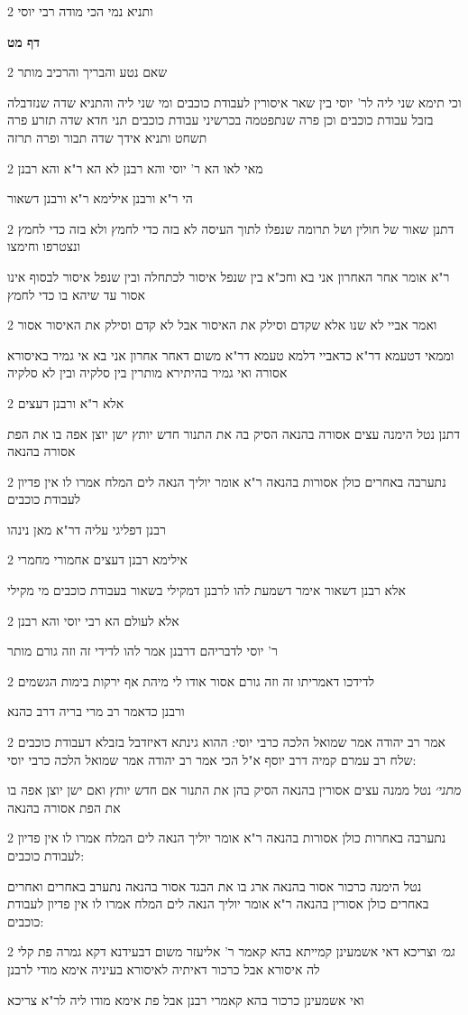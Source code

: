 \documentclass[12pt, openany]{book}
\newcommand{\sethebfont}{
\fontsize{10.5pt}{21.0pt} \selectfont
}
\newcommand{\twocol}[1]{
	{\sethebfont \begin{multicols}{2}
			#1
	\end{multicols}}	
}
\newcommand{\sectname}{}
\newcommand{\newsection}[1]{
	\addcontentsline{toc}{section}{#1}
	\renewcommand{\sectname}{#1}	
	\vspace{-\baselineskip}
	\begin{center}
		\textbf{%
\fontsize{16pt}{16pt}\selectfont
			#1}
	\end{center}
	\vspace{-\baselineskip}
	\nopagebreak
}
\begin{document}
\twocol{ותניא נמי הכי מודה רבי יוסי}
\newsection{דף מט}
\twocol{שאם נטע והבריך והרכיב מותר
\par וכי תימא שני ליה לר' יוסי בין שאר איסורין לעבודת כוכבים ומי שני ליה והתניא שדה שנזדבלה בזבל עבודת כוכבים וכן פרה שנתפטמה בכרשיני עבודת כוכבים תני חדא שדה תזרע פרה תשחט ותניא אידך שדה תבור ופרה תרזה}
\twocol{מאי לאו הא ר' יוסי והא רבנן לא הא ר"א והא רבנן
\par הי ר"א ורבנן אילימא ר"א ורבנן דשאור}
\twocol{דתנן שאור של חולין ושל תרומה שנפלו לתוך העיסה לא בזה כדי לחמץ ולא בזה כדי לחמץ ונצטרפו וחימצו
\par ר"א אומר אחר האחרון אני בא וחכ"א בין שנפל איסור לכתחלה ובין שנפל איסור לבסוף אינו אסור עד שיהא בו כדי לחמץ}
\twocol{ואמר אביי לא שנו אלא שקדם וסילק את האיסור אבל לא קדם וסילק את האיסור אסור
\par וממאי דטעמא דר"א כדאביי דלמא טעמא דר"א משום דאחר אחרון אני בא אי גמיר באיסורא אסורה ואי גמיר בהיתירא מותרין בין סלקיה ובין לא סלקיה}
\twocol{אלא ר"א ורבנן דעצים
\par דתנן נטל הימנה עצים אסורה בהנאה הסיק בה את התנור חדש יותץ ישן יוצן אפה בו את הפת אסורה בהנאה}
\twocol{נתערבה באחרים כולן אסורות בהנאה ר"א אומר יוליך הנאה לים המלח אמרו לו אין פדיון לעבודת כוכבים
\par רבנן דפליגי עליה דר"א מאן נינהו}
\twocol{אילימא רבנן דעצים אחמורי מחמרי
\par אלא רבנן דשאור אימר דשמעת להו לרבנן דמקילי בשאור בעבודת כוכבים מי מקילי}
\twocol{אלא לעולם הא רבי יוסי והא רבנן
\par ר' יוסי לדבריהם דרבנן אמר להו לדידי זה וזה גורם מותר}
\twocol{לדידכו דאמריתו זה וזה גורם אסור אודו לי מיהת אף ירקות בימות הגשמים
\par ורבנן כדאמר רב מרי בריה דרב כהנא}
\twocol{אמר רב יהודה אמר שמואל הלכה כרבי יוסי: ההוא גינתא דאיזדבל בזבלא דעבודת כוכבים שלח רב עמרם קמיה דרב יוסף א"ל הכי אמר רב יהודה אמר שמואל הלכה כרבי יוסי:
\par {\large\emph{מתני׳}} נטל ממנה עצים אסורין בהנאה הסיק בהן את התנור אם חדש יותץ ואם ישן יוצן אפה בו את הפת אסורה בהנאה}
\twocol{נתערבה באחרות כולן אסורות בהנאה ר"א אומר יוליך הנאה לים המלח אמרו לו אין פדיון לעבודת כוכבים:
\par נטל הימנה כרכור אסור בהנאה ארג בו את הבגד אסור בהנאה נתערב באחרים ואחרים באחרים כולן אסורין בהנאה ר"א אומר יוליך הנאה לים המלח אמרו לו אין פדיון לעבודת כוכבים:}
\twocol{{\large\emph{גמ׳}} וצריכא דאי אשמעינן קמייתא בהא קאמר ר' אליעזר משום דבעידנא דקא גמרה פת קלי לה איסורא אבל כרכור דאיתיה לאיסורא בעיניה אימא מודי לרבנן
\par ואי אשמעינן כרכור בהא קאמרי רבנן אבל פת אימא מודו ליה לר"א צריכא}
\end{document}
